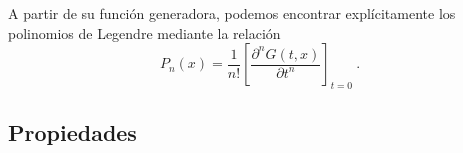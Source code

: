 

A partir de su función generadora, podemos encontrar explícitamente los polinomios de Legendre mediante la relación
\begin{equation}
    P_n(x) = \frac{1}{n!} \left[ \frac{\partial ^n G(t,x)}{\partial t^n}  \right]_{t=0} \ .
\end{equation}

\subsection{Propiedades}

